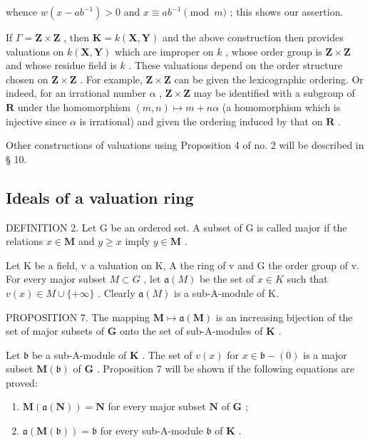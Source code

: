 whence \(w(x - ab^{-1}) > 0\) and \(x \equiv ab^{-1} \pmod{m}\) ; this shows our assertion.

If \(\Gamma = \mathbf{Z} \times \mathbf{Z}\) , then \(\mathbf{K} = k(\mathbf{X}, \mathbf{Y})\) and the above construction then provides valuations on \(k(\mathbf{X}, \mathbf{Y})\) which are improper on \(k\) , whose order group is \(\mathbf{Z} \times \mathbf{Z}\) and whose residue field is \(k\) . These valuations depend on the order structure chosen on \(\mathbf{Z} \times \mathbf{Z}\) . For example, \(\mathbf{Z} \times \mathbf{Z}\) can be given the lexicographic ordering. Or indeed, for an irrational number \(\alpha\) , \(\mathbf{Z} \times \mathbf{Z}\) may be identified with a subgroup of \(\mathbf{R}\) under the homomorphism \((m, n) \mapsto m + n\alpha\) (a homomorphism which is injective since \(\alpha\) is irrational) and given the ordering induced by that on \(\mathbf{R}\) .

Other constructions of valuations using Proposition 4 of no. 2 will be described in § 10.

\subsection{Ideals of a valuation ring}

DEFINITION 2. Let G be an ordered set. A subset of G is called major if the relations \(x \in \mathbf{M}\) and \(y \geqslant x\) imply \(y \in \mathbf{M}\) .

Let K be a field, v a valuation on K, A the ring of v and G the order group of v. For every major subset \(M \subset G\) , let \(\mathfrak{a}(M)\) be the set of \(x \in K\) such that \(v(x) \in M \cup \{+\infty\}\) . Clearly \(\mathfrak{a}(M)\) is a sub-A-module of K.

PROPOSITION 7. The mapping \(\mathbf{M} \mapsto \mathfrak{a}(\mathbf{M})\) is an increasing bijection of the set of major subsets of \(\mathbf{G}\) onto the set of sub-A-modules of \(\mathbf{K}\) .

Let \(\mathfrak{b}\) be a sub-A-module of \(\mathbf{K}\) . The set of \(v(x)\) for \(x \in \mathfrak{b} - (0)\) is a major subset \(\mathbf{M}(\mathfrak{b})\) of \(\mathbf{G}\) . Proposition 7 will be shown if the following equations are proved:

\begin{enumerate}
\def\labelenumi{(\arabic{enumi})}
\setcounter{enumi}{1}
\item
  \(\mathbf{M}(\mathfrak{a}(\mathbf{N})) = \mathbf{N}\) for every major subset \(\mathbf{N}\) of \(\mathbf{G}\) ;
\item
  \(\mathfrak{a}(\mathbf{M}(\mathfrak{b})) = \mathfrak{b}\) for every sub-A-module \(\mathfrak{b}\) of \(\mathbf{K}\) .
\end{enumerate}

